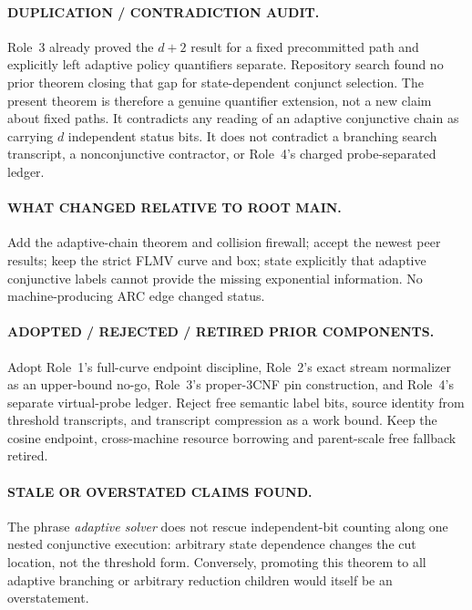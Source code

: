 \documentclass[11pt]{article}
\begin{document}
\paragraph{DUPLICATION / CONTRADICTION AUDIT.}
Role~3 already proved the $d+2$ result for a fixed precommitted path and
explicitly left adaptive policy quantifiers separate.  Repository search found
no prior theorem closing that gap for state-dependent conjunct selection.  The
present theorem is therefore a genuine quantifier extension, not a new claim
about fixed paths.  It contradicts any reading of an adaptive conjunctive
chain as carrying $d$ independent status bits.  It does not contradict a
branching search transcript, a nonconjunctive contractor, or Role~4's charged
probe-separated ledger.

\paragraph{WHAT CHANGED RELATIVE TO ROOT MAIN.}
Add the adaptive-chain theorem and collision firewall; accept the newest peer
results; keep the strict FLMV curve and box; state explicitly that adaptive
conjunctive labels cannot provide the missing exponential information.  No
machine-producing ARC edge changed status.

\paragraph{ADOPTED / REJECTED / RETIRED PRIOR COMPONENTS.}
Adopt Role~1's full-curve endpoint discipline, Role~2's exact stream
normalizer as an upper-bound no-go, Role~3's proper-3CNF pin construction, and
Role~4's separate virtual-probe ledger.  Reject free semantic label bits,
source identity from threshold transcripts, and transcript compression as a
work bound.  Keep the cosine endpoint, cross-machine resource borrowing and
parent-scale free fallback retired.

\paragraph{STALE OR OVERSTATED CLAIMS FOUND.}
The phrase \emph{adaptive solver} does not rescue independent-bit counting
along one nested conjunctive execution: arbitrary state dependence changes
the cut location, not the threshold form.  Conversely, promoting this theorem
to all adaptive branching or arbitrary reduction children would itself be an
overstatement.
\end{document}
